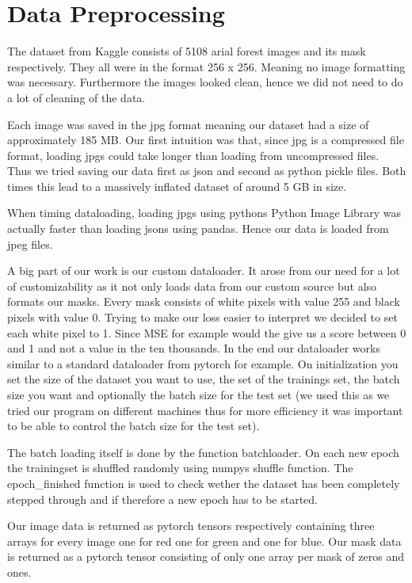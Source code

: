 \section{Data Preprocessing}
The dataset from Kaggle consists of 5108 arial forest images and its mask
respectively. They all were in the format 256 x 256. Meaning no image formatting was necessary.
Furthermore the images looked clean, hence we did not need to do
a lot of cleaning of the data.

Each image was saved in the jpg format meaning our
dataset had a size of approximately 185 MB.
Our first intuition was that, since jpg is a
compressed file format, loading jpgs could take longer
than loading from uncompressed files. Thus we tried saving our
data first as json and second as python pickle files.
Both times this lead to a massively inflated dataset of
around 5 GB in size.

When timing dataloading, loading jpgs using pythons
Python Image Library was actually faster than loading jsons
using pandas. Hence our data is loaded from jpeg files.

A big part of our work is our custom dataloader.
It arose from our need for a lot of customizability as it not
only loads data from our custom source but also formats our masks.
 Every mask consists of white pixels with value 255 and black
 pixels with value 0. Trying to make our loss easier to interpret
 we decided to set each white pixel to 1. Since MSE for example would
 the give us a score between 0 and 1 and not a value in the ten thousands.
In the end our dataloader works similar to a standard dataloader
from pytorch for example.
On initialization you set the size of the dataset you want to
use, the set of the trainings set, the batch size you want and
optionally the batch size for the test set
(we used this as we tried our program on different machines thus for
more efficiency it was important to be able to control the batch size
for the test set).

The batch loading itself is done by the function batchloader.
On each new epoch the trainingset is shuffled randomly using numpys
shuffle function. The epoch\_finished function is used to check wether
 the dataset has been completely stepped through and if therefore a new
 epoch has to be started.

Our image data is returned as pytorch tensors respectively containing
three arrays for every image one for red one for green and one for blue.
 Our mask data is returned as a pytorch tensor consisting of only one
 array per mask of zeros and ones.

